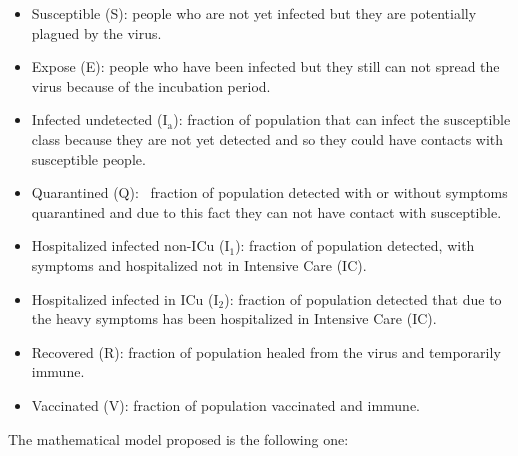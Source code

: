 \documentclass[a4paper]{article}
\providecommand\textsubscript[1]{\ensuremath{{}_{\text{#1}}}}
\begin{document}
\begin{itemize}
\item \textcolor[rgb]{0.07450981,0.078431375,0.07450981}{Susceptible (S): people who are not yet infected but they are
potentially plagued by the virus.}
\item \textcolor[rgb]{0.07450981,0.078431375,0.07450981}{Expose (E): people who have been infected but they still can
not spread the virus because of the incubation period. }
\item \textcolor[rgb]{0.07450981,0.078431375,0.07450981}{Infected undetected
(I\-}\textcolor[rgb]{0.07450981,0.078431375,0.07450981}{\textsubscript{a}}\textcolor[rgb]{0.07450981,0.078431375,0.07450981}{):
fraction of population that can infect the susceptible class because they are not yet detected and so they could have
contacts with susceptible people.}
\item \textcolor[rgb]{0.07450981,0.078431375,0.07450981}{Quarantined (Q): \ fraction of population detected with or
without symptoms quarantined and due to this fact they can not have contact with susceptible.}
\item \textcolor[rgb]{0.07450981,0.078431375,0.07450981}{Hospitalized infected non-ICu
(I\-}\textcolor[rgb]{0.07450981,0.078431375,0.07450981}{\textsubscript{1}}\textcolor[rgb]{0.07450981,0.078431375,0.07450981}{):
fraction of population detected, with symptoms and }\textcolor[rgb]{0.07450981,0.078431375,0.07450981}{hospitalized not
in Intensive Care (IC).}
\item \textcolor[rgb]{0.07450981,0.078431375,0.07450981}{Hospitalized infected in ICu
(I\-}\textcolor[rgb]{0.07450981,0.078431375,0.07450981}{\textsubscript{2}}\textcolor[rgb]{0.07450981,0.078431375,0.07450981}{):
fraction of population detected that due to the heavy symptoms has been hospitalized in Intensive Care (IC).}
\item \textcolor[rgb]{0.07450981,0.078431375,0.07450981}{Recovered (R): fraction of population healed from the virus and
temporarily immune.}
\item \textcolor[rgb]{0.07450981,0.078431375,0.07450981}{Vaccinated (V): fraction of population vaccinated and immune.}
\end{itemize}
\textcolor[rgb]{0.07450981,0.078431375,0.07450981}{The mathematical model proposed is the following
one\footnotemark{}:}
\end{document}
